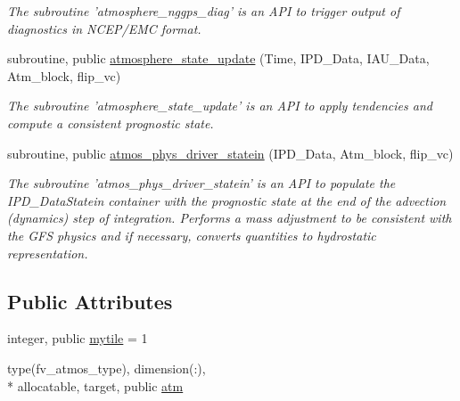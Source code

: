 \begin{DoxyCompactItemize}
\begin{DoxyCompactList}\small\item\em The subroutine 'atmosphere\-\_\-nggps\-\_\-diag' is an A\-P\-I to trigger output of diagnostics in N\-C\-E\-P/\-E\-M\-C format. \end{DoxyCompactList}\item 
subroutine, public \hyperlink{classatmosphere__mod_abf96613ef8db32b3e66f3297f62a0346}{atmosphere\-\_\-state\-\_\-update} (Time, I\-P\-D\-\_\-\-Data, I\-A\-U\-\_\-\-Data, Atm\-\_\-block, flip\-\_\-vc)
\begin{DoxyCompactList}\small\item\em The subroutine 'atmosphere\-\_\-state\-\_\-update' is an A\-P\-I to apply tendencies and compute a consistent prognostic state. \end{DoxyCompactList}\item 
subroutine, public \hyperlink{classatmosphere__mod_a5dfb607fd7c0bb4cd771a72f1daf8ded}{atmos\-\_\-phys\-\_\-driver\-\_\-statein} (I\-P\-D\-\_\-\-Data, Atm\-\_\-block, flip\-\_\-vc)
\begin{DoxyCompactList}\small\item\em The subroutine 'atmos\-\_\-phys\-\_\-driver\-\_\-statein' is an A\-P\-I to populate the I\-P\-D\-\_\-\-DataStatein container with the prognostic state at the end of the advection (dynamics) step of integration.  Performs a mass adjustment to be consistent with the G\-F\-S physics and if necessary, converts quantities to hydrostatic representation. \end{DoxyCompactList}\end{DoxyCompactItemize}
\subsection*{Public Attributes}
\begin{DoxyCompactItemize}
\item 
integer, public \hyperlink{classatmosphere__mod_a72d23c8d327e3066174b6e43f5697494}{mytile} = 1
\item 
type(fv\-\_\-atmos\-\_\-type), dimension(\-:), \\*
allocatable, target, public \hyperlink{classatmosphere__mod_a65be72573dcfd288a47a65ffaf881284}{atm}
\end{DoxyCompactItemize}
